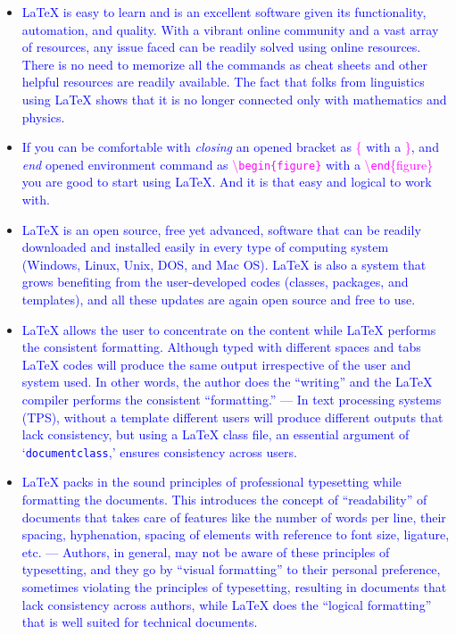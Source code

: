 \documentclass[phd]{ndsu-thesis-2022}
\newcommand\italk[1]{\textcolor{blue}{#1}}  %
\newcommand\cmd[1]{\textbackslash\texttt{#1}}  %
\newcommand\lx{\LaTeX\xspace}
\newcommand\vb[1]{\textcolor{blue}{\texttt{#1}}}%
\begin{document}
\begin{itemize}[leftmargin=*, itemsep=0pt, parsep=3pt] 

\item \italk{\lx is easy to learn and is an excellent software given its functionality, automation, and quality. With a vibrant online community and a vast array of resources, any issue faced can be readily solved using online resources. There is no need to memorize all the commands as cheat sheets and other helpful resources are readily available. The fact that folks from linguistics using \lx shows that it is no longer connected only with mathematics and physics.} 

\item \italk{ If you can be comfortable with \emph{closing} an opened bracket as \textcolor{magenta}{\{} with a \textcolor{magenta}{\}}, and \emph{end} opened environment command as \textcolor{magenta}{\cmd{begin\{figure\}}} with a  \textcolor{magenta}{\cmd{end}\{figure\}} you are good to start using \lx. And it is that easy and logical to work with.}

\item \italk{\lx is an open source, free yet advanced, software that can be readily downloaded and installed easily in every type of computing system (Windows, Linux, Unix, DOS, and Mac OS). \lx is also a system that grows benefiting from the user-developed codes (classes, packages, and templates), and all these updates are again open source and free to use.}  

\item \italk{\lx allows the user to concentrate on the content while \lx performs the consistent formatting. Although typed with different spaces and tabs \lx codes will produce the same output irrespective of the user and system used. In other words, the author does the ``writing'' and the \lx compiler performs the consistent ``formatting.'' --- In text processing systems (TPS), without a template different users will produce different outputs that lack consistency, but using a \lx class file, an essential argument of `\vb{documentclass},' ensures consistency across users.}  

\item \italk{\lx packs in the sound principles of professional typesetting while formatting the documents. This introduces the concept of ``readability'' of documents that takes care of features like the number of words per line, their spacing, hyphenation, spacing of elements with reference to font size, ligature, etc. --- Authors, in general, may not be aware of these principles of typesetting, and they go by ``visual formatting'' to their personal preference, sometimes violating the principles of typesetting, resulting in documents that lack consistency across authors, while \lx does the ``logical formatting'' that is well suited for technical documents.} 


\end{itemize}
\end{document}
